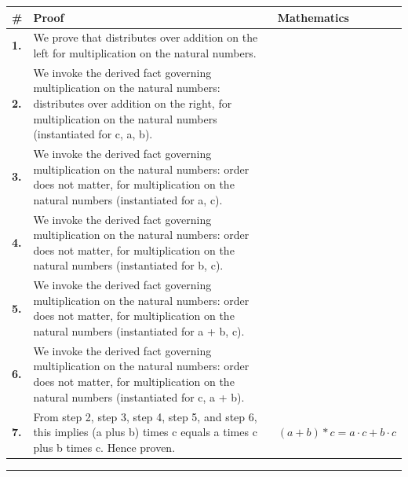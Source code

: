 \documentclass[11pt]{article}
\theoremstyle{definition}
\begin{document}
\begin{tabular}{@{} >{\raggedright\arraybackslash}p{} >{\raggedright\arraybackslash}p{} >{\raggedleft\arraybackslash}p{} @{}}
\textbf{\#} & \textbf{Proof} & \textbf{Mathematics} \\
\midrule
\textbf{1.} & We prove that distributes over addition on the left for multiplication on the natural numbers. & \\[0.45em]
\textbf{2.} & We invoke the derived fact governing multiplication on the natural numbers: distributes over addition on the right, for multiplication on the natural numbers (instantiated for c, a, b). & \\[0.45em]
\textbf{3.} & We invoke the derived fact governing multiplication on the natural numbers: order does not matter, for multiplication on the natural numbers (instantiated for a, c). & \\[0.45em]
\textbf{4.} & We invoke the derived fact governing multiplication on the natural numbers: order does not matter, for multiplication on the natural numbers (instantiated for b, c). & \\[0.45em]
\textbf{5.} & We invoke the derived fact governing multiplication on the natural numbers: order does not matter, for multiplication on the natural numbers (instantiated for a + b, c). & \\[0.45em]
\textbf{6.} & We invoke the derived fact governing multiplication on the natural numbers: order does not matter, for multiplication on the natural numbers (instantiated for c, a + b). & \\[0.45em]
\textbf{7.} & From step 2, step 3, step 4, step 5, and step 6, this implies (a plus b) times c equals a times c plus b times c. Hence proven. & $\displaystyle (a + b) * c = a \cdot c + b \cdot c$ \\[0.45em]
\bottomrule
\end{tabular}
\label{thm:Nat-multiplication-distributes_over_addition_on_the_left}
\par\medskip\hrule
\end{document}
